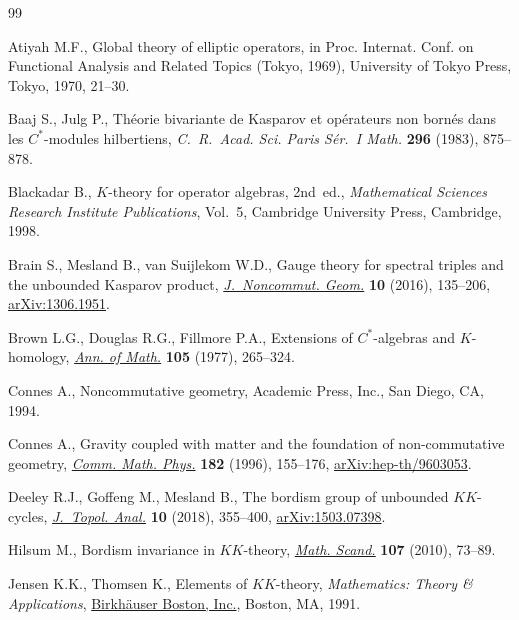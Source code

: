 \documentclass[pdftex]{sigma}
\numberwithin{equation}{section}
\begin{document}
\begin{thebibliography}{99}
\footnotesize\itemsep=0pt

Atiyah M.F., Global theory of elliptic operators, in Proc. {I}nternat. {C}onf.
 on {F}unctional {A}nalysis and {R}elated {T}opics ({T}okyo, 1969), University
 of Tokyo Press, Tokyo, 1970, 21--30.

Baaj S., Julg P., Th\'eorie bivariante de {K}asparov et op\'erateurs non
 born\'es dans les {$C^*$}-modules hilbertiens, \textit{C.~R.~Acad. Sci. Paris
 S\'er.~I Math.} \textbf{296} (1983), 875--878.

Blackadar B., {$K$}-theory for operator algebras, 2nd~ed., \textit{Mathematical Sciences
 Research Institute Publications}, Vol.~5, Cambridge University
 Press, Cambridge, 1998.

Brain S., Mesland B., van Suijlekom W.D., Gauge theory for spectral triples and
 the unbounded {K}asparov product, \href{https://doi.org/10.4171/JNCG/230}{\textit{J.~Noncommut. Geom.}} \textbf{10}
 (2016), 135--206, \href{https://arxiv.org/abs/1306.1951}{arXiv:1306.1951}.

Brown L.G., Douglas R.G., Fillmore P.A., Extensions of {$C^*$}-algebras and
 {$K$}-homology, \href{https://doi.org/10.2307/1970999}{\textit{Ann. of Math.}} \textbf{105} (1977), 265--324.

Connes A., Noncommutative geometry, Academic Press, Inc., San Diego, CA, 1994.

Connes A., Gravity coupled with matter and the foundation of non-commutative
 geometry, \href{https://doi.org/10.1007/BF02506388}{\textit{Comm. Math. Phys.}} \textbf{182} (1996), 155--176,
 \href{https://arxiv.org/abs/hep-th/9603053}{arXiv:hep-th/9603053}.

Deeley R.J., Goffeng M., Mesland B., The bordism group of unbounded
 {$KK$}-cycles, \href{https://doi.org/10.1142/S1793525318500012}{\textit{J.~Topol. Anal.}} \textbf{10} (2018), 355--400,
 \href{https://arxiv.org/abs/1503.07398}{arXiv:1503.07398}.

Hilsum M., Bordism invariance in {$KK$}-theory, \href{https://doi.org/10.7146/math.scand.a-15143}{\textit{Math. Scand.}}
 \textbf{107} (2010), 73--89.

Jensen K.K., Thomsen K., Elements of {$KK$}-theory, \textit{Mathematics: Theory \&
 Applications}, \href{https://doi.org/10.1007/978-1-4612-0449-7}{Birkh\"auser Boston, Inc.}, Boston, MA, 1991.


\end{thebibliography}
\end{document}
